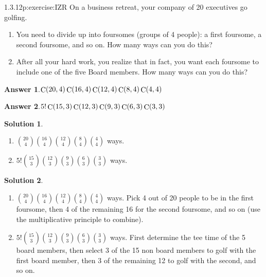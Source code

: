 \documentclass[twoside,11pt,]{book}
\newcommand{\blocktitlefont}{\relax}
\numberwithin{equation}{chapter}
\begin{document}
\begin{divisionsolution}{1.3.12}{}{p:exercise:IZR}%
On a business retreat, your company of 20 executives go golfing.%
\begin{enumerate}[label=(\alph*)]
\item{}You need to divide up into foursomes (groups of 4 people): a first foursome, a second foursome, and so on. How many ways can you do this?%
\item{}After all your hard work, you realize that in fact, you want each foursome to include one of the five Board members. How many ways can you do this?%
\end{enumerate}
%
\par\smallskip%
\noindent\textbf{\blocktitlefont Answer 1}.\quad{}\(\mathop{\rm C}\nolimits\!\left(20,4\right)\mathop{\rm C}\nolimits\!\left(16,4\right)\mathop{\rm C}\nolimits\!\left(12,4\right)\mathop{\rm C}\nolimits\!\left(8,4\right)\mathop{\rm C}\nolimits\!\left(4,4\right)\)%
\par\smallskip%
\noindent\textbf{\blocktitlefont Answer 2}.\quad{}\(5!\mathop{\rm C}\nolimits\!\left(15,3\right)\mathop{\rm C}\nolimits\!\left(12,3\right)\mathop{\rm C}\nolimits\!\left(9,3\right)\mathop{\rm C}\nolimits\!\left(6,3\right)\mathop{\rm C}\nolimits\!\left(3,3\right)\)%
\par\smallskip%
\noindent\textbf{\blocktitlefont Solution 1}.\quad{}%
\begin{enumerate}[label=(\alph*)]
\item{}\({20 \choose 4}{16 \choose 4}{12 \choose 4}{8 \choose 4}{4 \choose 4}\) ways.%
\item{}\(5!{15 \choose 3}{12 \choose 3}{9 \choose 3}{6 \choose 3}{3 \choose 3}\) ways.%
\end{enumerate}
%
\par\smallskip%
\noindent\textbf{\blocktitlefont Solution 2}.\quad{}%
\begin{enumerate}[label=(\alph*)]
\item{}\({20 \choose 4}{16 \choose 4}{12 \choose 4}{8 \choose 4}{4 \choose 4}\) ways. Pick 4 out of 20 people to be in the first foursome, then 4 of the remaining 16 for the second foursome, and so on (use the multiplicative principle to combine).%
\item{}\(5!{15 \choose 3}{12 \choose 3}{9 \choose 3}{6 \choose 3}{3 \choose 3}\) ways. First determine the tee time of the 5 board members, then select 3 of the 15 non board members to golf with the first board member, then 3 of the remaining 12 to golf with the second, and so on.%
\end{enumerate}
%
\end{divisionsolution}%
\end{document}
